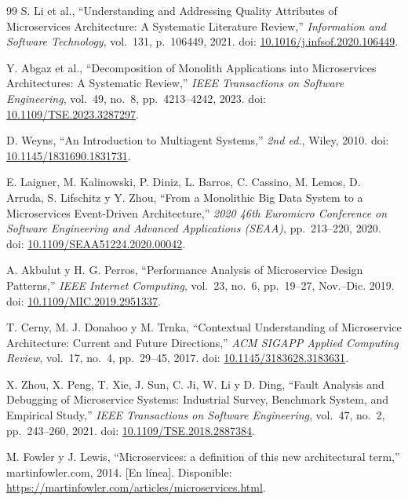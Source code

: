 \documentclass[12pt,a4paper]{article}
\begin{document}
\begin{thebibliography}{99}
S. Li et al.,
``Understanding and Addressing Quality Attributes of Microservices Architecture: A Systematic Literature Review,''
\textit{Information and Software Technology},
vol.~131, p.~106449, 2021.
doi: \href{https://doi.org/10.1016/j.infsof.2020.106449}{10.1016/j.infsof.2020.106449}.
 
Y. Abgaz et al.,
``Decomposition of Monolith Applications into Microservices Architectures: A Systematic Review,''
\textit{IEEE Transactions on Software Engineering},
vol.~49, no.~8, pp.~4213--4242, 2023.
doi: \href{https://doi.org/10.1109/TSE.2023.3287297}{10.1109/TSE.2023.3287297}.
 
D. Weyns,
``An Introduction to Multiagent Systems,''
\textit{2nd ed.}, Wiley, 2010.
doi: \href{https://doi.org/10.1145/1831690.1831731}{10.1145/1831690.1831731}.
 
E. Laigner, M. Kalinowski, P. Diniz, L. Barros, C. Cassino, M. Lemos, D. Arruda, S. Lifschitz y Y. Zhou,
``From a Monolithic Big Data System to a Microservices Event-Driven Architecture,''
\textit{2020 46th Euromicro Conference on Software Engineering and Advanced Applications (SEAA)},
pp.~213--220, 2020.
doi: \href{https://doi.org/10.1109/SEAA51224.2020.00042}{10.1109/SEAA51224.2020.00042}.
 
A. Akbulut y H. G. Perros,
``Performance Analysis of Microservice Design Patterns,''
\textit{IEEE Internet Computing},
vol.~23, no.~6, pp.~19--27, Nov.--Dic. 2019.
doi: \href{https://doi.org/10.1109/MIC.2019.2951337}{10.1109/MIC.2019.2951337}.
 
T. Cerny, M. J. Donahoo y M. Trnka,
``Contextual Understanding of Microservice Architecture: Current and Future Directions,''
\textit{ACM SIGAPP Applied Computing Review},
vol.~17, no.~4, pp.~29--45, 2017.
doi: \href{https://doi.org/10.1145/3183628.3183631}{10.1145/3183628.3183631}.
 
X. Zhou, X. Peng, T. Xie, J. Sun, C. Ji, W. Li y D. Ding,
``Fault Analysis and Debugging of Microservice Systems: Industrial Survey, Benchmark System, and Empirical Study,''
\textit{IEEE Transactions on Software Engineering},
vol.~47, no.~2, pp.~243--260, 2021.
doi: \href{https://doi.org/10.1109/TSE.2018.2887384}{10.1109/TSE.2018.2887384}.
 
M. Fowler y J. Lewis,
``Microservices: a definition of this new architectural term,''
martinfowler.com, 2014.
[En línea]. Disponible: \url{https://martinfowler.com/articles/microservices.html}.
 

\end{thebibliography}
\end{document}
